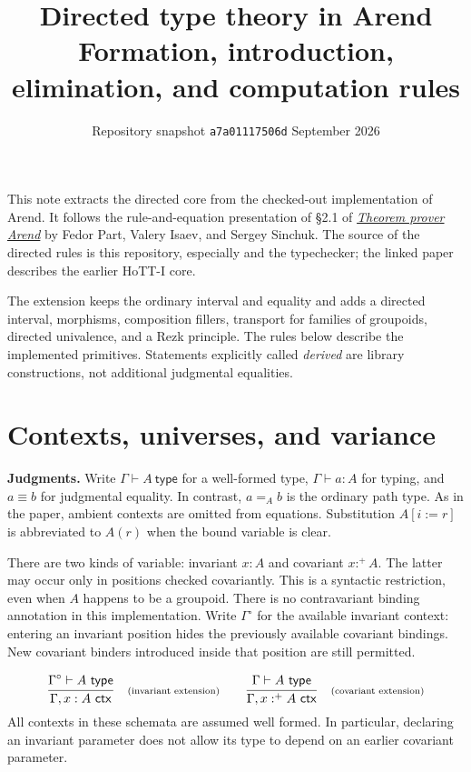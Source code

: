 \documentclass[11pt,a4paper]{article}
\title{\vspace{-12mm}Directed type theory in Arend\\[3pt]
  \large Formation, introduction, elimination, and computation rules}
\author{}
\date{Repository snapshot \texttt{a7a01117506d}\quad\textbullet\quad 22 September 2026}
\newcommand{\ty}{\ \mathsf{type}}
\newcommand{\ctx}{\ \mathsf{ctx}}
\newcommand{\rulelabel}[1]{\quad\text{\scriptsize(#1)}}
\newcommand{\infer}[3]{\frac{\begin{gathered}#1\end{gathered}}{#2}\rulelabel{#3}}
\newcommand{\code}[1]{\texttt{\detokenize{#1}}}
\begin{document}
\maketitle
\vspace{-8mm}
\thispagestyle{plain}

This note extracts the directed core from the checked-out implementation of
Arend. It follows the rule-and-equation presentation of \S2.1 of
\href{https://arend-lang.github.io/assets/lang-paper.pdf}{\emph{Theorem prover
Arend}} by Fedor Part, Valery Isaev, and Sergey Sinchuk. The source of the
directed rules is this repository, especially \code{lib/Prelude.ard} and the
typechecker; the linked paper describes the earlier HoTT-I core.

The extension keeps the ordinary interval and equality and adds a directed
interval, morphisms, composition fillers, transport for families of groupoids,
directed univalence, and a Rezk principle. The rules below describe the
implemented primitives. Statements explicitly called \emph{derived} are
library constructions, not additional judgmental equalities.

\section{Contexts, universes, and variance}\label{sec:contexts}

\textbf{Judgments.} Write $\Gamma\vdash A\ty$ for a well-formed type,
$\Gamma\vdash a:A$ for typing, and $a\equiv b$ for judgmental equality.
In contrast, $a=_A b$ is the ordinary path type. As in the paper, ambient
contexts are omitted from equations. Substitution $A[i:=r]$ is abbreviated
to $A(r)$ when the bound variable is clear.

There are two kinds of variable: invariant $x:A$ and covariant $x:^{+}A$.
The latter may occur only in positions checked covariantly. This is a
syntactic restriction, even when $A$ happens to be a groupoid. There is no
contravariant binding annotation in this implementation.
Write $\Gamma^\circ$ for the available invariant context: entering an
invariant position hides the previously available covariant bindings.
New covariant binders introduced inside that position are still permitted.

\[
\infer{\Gamma^\circ\vdash A\ty}{\Gamma,x:A\ctx}{invariant extension}
\qquad
\infer{\Gamma\vdash A\ty}{\Gamma,x:^{+}A\ctx}{covariant extension}
\]
All contexts in these schemata are assumed well formed. In particular,
declaring an invariant parameter does not allow its type to depend on an
earlier covariant parameter.
\end{document}
